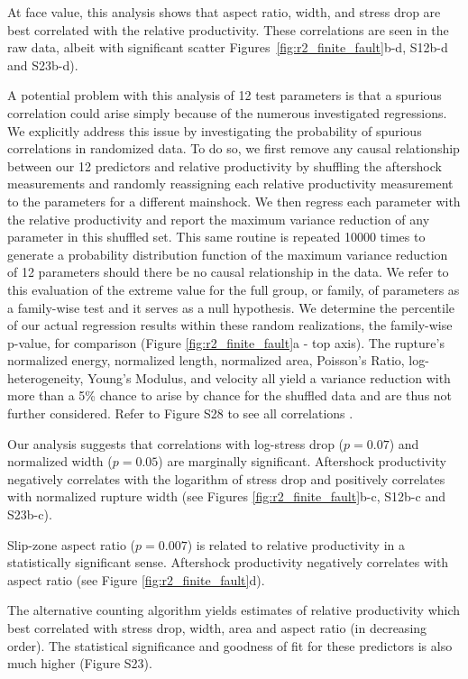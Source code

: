 \documentclass[draft, jgrga]{agujournal2018}
\begin{document}
    At face value, this analysis shows that aspect ratio, width, and stress drop are best correlated with the relative productivity. These correlations are seen in the raw data, albeit with significant scatter Figures~\ref{fig:r2_finite_fault}b-d, S12b-d and S23b-d).

    A potential problem with this analysis of 12 test parameters is that a spurious correlation could arise simply because of the numerous investigated regressions. We explicitly address this issue by investigating the probability of spurious correlations in randomized data. To do so, we first remove any causal relationship between our 12 predictors and relative productivity by shuffling the aftershock measurements and randomly reassigning each relative productivity measurement to the parameters for a different mainshock. We then regress each parameter with the relative productivity and report the maximum variance reduction of any parameter in this shuffled set. This same routine is repeated 10000 times to generate a probability distribution function of the maximum variance reduction of 12 parameters should there be no causal relationship in the data. We refer to this evaluation of the extreme value for the full group, or family, of parameters as a family-wise test and it serves as a null hypothesis. We determine the percentile of our actual regression results within these random realizations, the family-wise p-value, for comparison (Figure \ref{fig:r2_finite_fault}a - top axis). The rupture's normalized energy, normalized length, normalized area, Poisson's Ratio, log-heterogeneity, Young's Modulus, and velocity all yield a variance reduction with more than a 5\% chance to arise by chance for the shuffled data and are thus not further considered. Refer to Figure S28 to see all correlations \citep{Convers2011GlobalMid2010, Hayes2017}.

    Our analysis suggests that correlations with log-stress drop ($p = 0.07$) and normalized width ($p = 0.05$) are mar\-gi\-nally significant. Aftershock productivity negatively correlates with the logarithm of stress drop and positively correlates with normalized rupture width (see Figures \ref{fig:r2_finite_fault}b-c, S12b-c and S23b-c).

    Slip-zone aspect ratio ($p = 0.007$) is related to relative productivity in a statistically significant sense. Aftershock productivity negatively correlates with aspect ratio (see Figure \ref{fig:r2_finite_fault}d).

    The alternative counting algorithm yields estimates of relative productivity which best correlated with stress drop, width, area and aspect ratio (in decreasing order). The statistical significance and goodness of fit for these predictors is also much higher (Figure S23).
\end{document}
